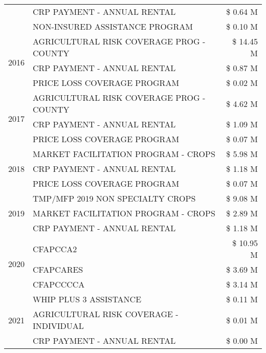 \begin{tabular}{llr}
 & CRP PAYMENT - ANNUAL RENTAL & \$ 0.64 M \\
 & NON-INSURED ASSISTANCE PROGRAM & \$ 0.10 M \\
\cline{1-3}
\multirow[t]{3}{*}{2016} & AGRICULTURAL RISK COVERAGE PROG - COUNTY      & \$ 14.45 M \\
 & CRP PAYMENT - ANNUAL RENTAL                   & \$ 0.87 M \\
 & PRICE LOSS COVERAGE PROGRAM                   & \$ 0.02 M \\
\cline{1-3}
\multirow[t]{3}{*}{2017} & AGRICULTURAL RISK COVERAGE PROG - COUNTY & \$ 4.62 M \\
 & CRP PAYMENT - ANNUAL RENTAL & \$ 1.09 M \\
 & PRICE LOSS COVERAGE PROGRAM & \$ 0.07 M \\
\cline{1-3}
\multirow[t]{3}{*}{2018} & MARKET FACILITATION PROGRAM - CROPS & \$ 5.98 M \\
 & CRP PAYMENT - ANNUAL RENTAL & \$ 1.18 M \\
 & PRICE LOSS COVERAGE PROGRAM & \$ 0.07 M \\
\cline{1-3}
\multirow[t]{3}{*}{2019} & TMP/MFP 2019 NON SPECIALTY CROPS & \$ 9.08 M \\
 & MARKET FACILITATION PROGRAM - CROPS & \$ 2.89 M \\
 & CRP PAYMENT - ANNUAL RENTAL & \$ 1.18 M \\
\cline{1-3}
\multirow[t]{3}{*}{2020} & CFAPCCA2 & \$ 10.95 M \\
 & CFAPCARES & \$ 3.69 M \\
 & CFAPCCCCA & \$ 3.14 M \\
\cline{1-3}
\multirow[t]{3}{*}{2021} & WHIP PLUS 3 ASSISTANCE & \$ 0.11 M \\
 & AGRICULTURAL RISK COVERAGE - INDIVIDUAL & \$ 0.01 M \\
 & CRP PAYMENT - ANNUAL RENTAL & \$ 0.00 M \\
\cline{1-3}
\bottomrule
\end{tabular}
